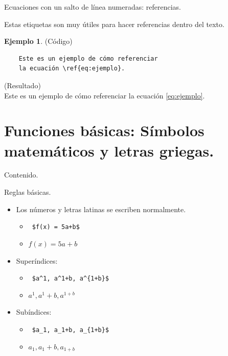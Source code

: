 \documentclass[dvipsnames,xcolor, handout]{beamer}
\theoremstyle{plain}
\theoremstyle{definition}
\newtheorem{ejemplo}{Ejemplo}
\begin{document}
\begin{frame}[fragile]{Ecuaciones con un salto de línea numeradas: referencias.}

Estas etiquetas son muy útiles para hacer referencias dentro del texto. 

    \begin{ejemplo}
    (Código) 
    \begin{verbatim}
    Este es un ejemplo de cómo referenciar
    la ecuación \ref{eq:ejemplo}.
    \end{verbatim}
    
     (Resultado)\\
     Este es un ejemplo de cómo referenciar
     la ecuación \ref{eq:ejemplo}.  
    \end{ejemplo}
    
    
\end{frame}

\section{Funciones básicas: Símbolos matemáticos y letras griegas.}
\begin{frame}{Contenido.}
  \tableofcontents[currentsection]
\end{frame}

\begin{frame}[fragile]{Reglas básicas.}
\begin{itemize}
    \item Los números y letras latinas se escriben normalmente.
    \begin{itemize}
        \item \verb! $f(x) = 5a+b$!
        \item $f(x) = 5a+b$
    \end{itemize}\pause
    \item Superíndices:
    \begin{itemize}
        \item \verb! $a^1, a^1+b, a^{1+b}$!
        \item  $a^1, a^1+b, a^{1+b}$
    \end{itemize}\pause
    \item Subíndices:
    \begin{itemize}
        \item \verb! $a_1, a_1+b, a_{1+b}$!
        \item  $a_1, a_1+b, a_{1+b}$
    \end{itemize}
\end{itemize}
\end{frame}
\end{document}
